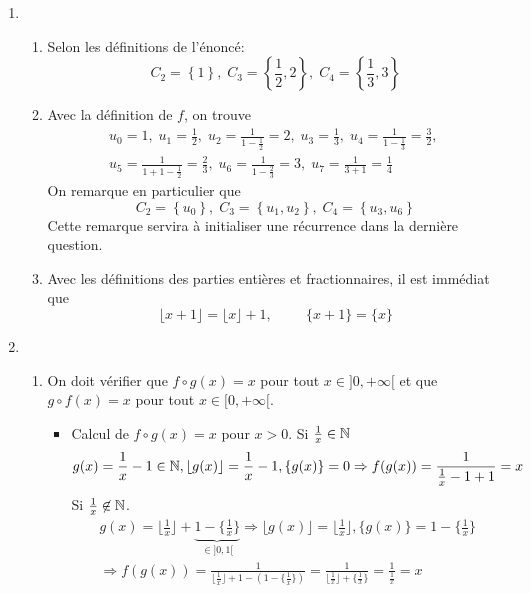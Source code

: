 \begin{enumerate}
 \item
\begin{enumerate}
 \item Selon les définitions de l'énoncé:
\begin{displaymath}
 C_2=\left\lbrace 1\right\rbrace,\;C_3=\left\lbrace \frac{1}{2},2\right\rbrace,\;
C_4=\left\lbrace \frac{1}{3}, 3\right\rbrace 
\end{displaymath}

 \item Avec la définition de $f$, on trouve
\begin{multline*}
 u_0=1,\;u_1=\frac{1}{2},\;u_2=\frac{1}{1-\frac{1}{2}}=2,\;
u_3=\frac{1}{3},\;u_4=\frac{1}{1-\frac{1}{3}}=\frac{3}{2},\;\\
u_5 = \frac{1}{1+1-\frac{1}{2}}=\frac{2}{3},\;
u_6=\frac{1}{1-\frac{2}{3}}=3,\;u_7=\frac{1}{3+1}=\frac{1}{4}
\end{multline*}
On remarque en particulier que
\begin{displaymath}
 C_2=\left\lbrace u_0\right\rbrace,\;C_3=\left\lbrace u_1, u_2\right\rbrace,\;
C_4=\left\lbrace u_3, u_6\right\rbrace  
\end{displaymath}
Cette remarque servira à initialiser une récurrence dans la dernière question.
 \item Avec les définitions des parties entières et fractionnaires, il est immédiat que
\begin{displaymath}
 \lfloor x+1 \rfloor = \lfloor x\rfloor +1 ,\hspace{1cm} \{x+1\} = \{x\} 
\end{displaymath}

\end{enumerate}

 \item
\begin{enumerate}
 \item On doit vérifier que $f \circ g(x)=x$ pour tout $x\in]0,+\infty[$ et que $g\circ f(x)=x$ pour tout $x\in[0,+\infty[$.
\begin{itemize}
 \item Calcul de $f \circ g(x)=x$ pour $x>0$.\newline
Si $\frac{1}{x}\in \mathbb{N}$
\begin{displaymath}
 g(x)=\frac{1}{x}-1\in \mathbb{N}, \lfloor g(x)\rfloor=\frac{1}{x}-1, \{g(x)\}=0
\Rightarrow f(g(x)) = \frac{1}{\frac{1}{x}-1+1}=x
\end{displaymath}
Si $\frac{1}{x}\not \in \mathbb{N}$.
\begin{multline*}
 g(x) = \lfloor \frac{1}{x}\rfloor + \underset{\in ]0,1[}{\underbrace{1 -\{\frac{1}{x}\}}}
\Rightarrow
\lfloor g(x)\rfloor= \lfloor\frac{1}{x}\rfloor, \{g(x)\}=1-\{\frac{1}{x}\}\\
\Rightarrow f(g(x))=
\frac{1}{\lfloor\frac{1}{x}\rfloor +1 -(1-\{\frac{1}{x}\})}
=\frac{1}{\lfloor\frac{1}{x}\rfloor + \{\frac{1}{x}\}}=\frac{1}{\frac{1}{x}}=x
\end{multline*}


\end{itemize}
\end{enumerate}
\end{enumerate}
